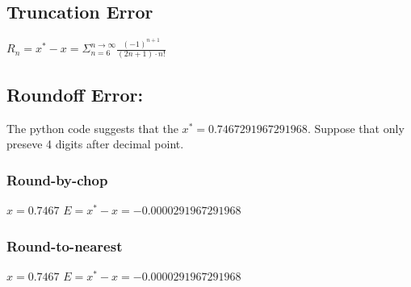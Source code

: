 \documentclass[12pt]{article}
\begin{document}
\subsection*{Truncation Error}
\begin{center}
    \(R_n = x^* - x = \Sigma_{n = 6}^{n \to \infty}\frac{{(-1)^{n+1}}}{(2n+1) \cdot n!}\)  
\end{center}
\subsection*{Roundoff Error:}
The python code suggests that the \(x^* =  0.7467291967291968.\) Suppose that only preseve 4 digits after decimal point.
\subsubsection*{Round-by-chop}
\begin{center}
    \(x = 0.7467\) \(E = x^* - x = -0.0000291967291968 \)
\end{center}
\subsubsection*{Round-to-nearest}
\begin{center}
    \(x = 0.7467\) \(E = x^* - x = -0.0000291967291968 \)
\end{center}
\end{document}
